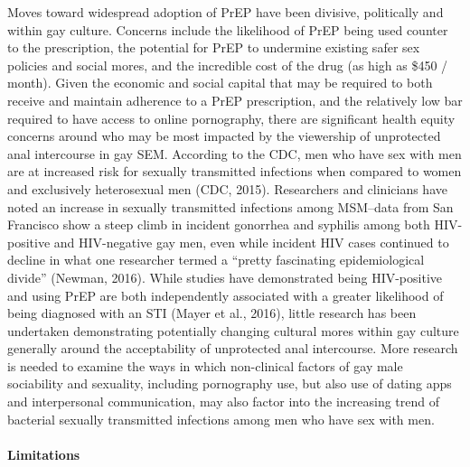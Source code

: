 \documentclass[]{article}
\let\oldparagraph\paragraph
\renewcommand{\paragraph}[1]{\oldparagraph{#1}\mbox{}}
\begin{document}
Moves toward widespread adoption of PrEP have been divisive, politically
and within gay culture. Concerns include the likelihood of PrEP being
used counter to the prescription, the potential for PrEP to undermine
existing safer sex policies and social mores, and the incredible cost of
the drug (as high as \$450 / month). Given the economic and social
capital that may be required to both receive and maintain adherence to a
PrEP prescription, and the relatively low bar required to have access to
online pornography, there are significant health equity concerns around
who may be most impacted by the viewership of unprotected anal
intercourse in gay SEM. According to the CDC, men who have sex with men
are at increased risk for sexually transmitted infections when compared
to women and exclusively heterosexual men (CDC, 2015). Researchers and
clinicians have noted an increase in sexually transmitted infections
among MSM--data from San Francisco show a steep climb in incident
gonorrhea and syphilis among both HIV-positive and HIV-negative gay men,
even while incident HIV cases continued to decline in what one
researcher termed a ``pretty fascinating epidemiological divide''
(Newman, 2016). While studies have demonstrated being HIV-positive and
using PrEP are both independently associated with a greater likelihood
of being diagnosed with an STI (Mayer et al., 2016), little research has
been undertaken demonstrating potentially changing cultural mores within
gay culture generally around the acceptability of unprotected anal
intercourse. More research is needed to examine the ways in which
non-clinical factors of gay male sociability and sexuality, including
pornography use, but also use of dating apps and interpersonal
communication, may also factor into the increasing trend of bacterial
sexually transmitted infections among men who have sex with men.

\paragraph{Limitations}\label{limitations}
\end{document}
